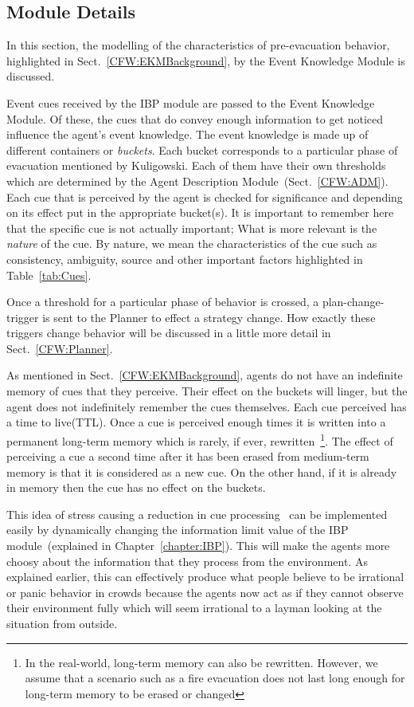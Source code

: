 \subsection{Module Details}
\label{CFW:EKMDetails}

In this section, the modelling of the characteristics of pre-evacuation behavior, highlighted in Sect.~\ref{CFW:EKMBackground}, by the Event Knowledge Module is discussed.

Event cues received by the IBP module are passed to the Event Knowledge Module. Of these, the cues that do convey enough information to get noticed influence the agent's event knowledge. The event knowledge is made up of different containers or \emph{buckets}. Each bucket corresponds to a particular phase of evacuation mentioned by Kuligowski. Each of them have their own thresholds which are determined by the Agent Description Module~(Sect.~\ref{CFW:ADM}). Each cue that is perceived by the agent is checked for significance and depending on its effect put in the appropriate bucket(s). It is important to remember here that the specific cue is not actually important; What is more relevant is the \emph{nature} of the cue. By nature, we mean the characteristics of the cue such as consistency, ambiguity, source and other important factors highlighted in Table~\ref{tab:Cues}.

Once a threshold for a particular phase of behavior is crossed, a plan-change-trigger is sent to the Planner to effect a strategy change. How exactly these triggers change behavior will be discussed in a little more detail in Sect.~\ref{CFW:Planner}.

As mentioned in Sect.~\ref{CFW:EKMBackground}, agents do not have an indefinite memory of cues that they perceive. Their effect on the buckets will linger, but the agent does not indefinitely remember the cues themselves. Each cue perceived has a time to live(TTL). Once a cue is perceived enough times it is written into a permanent long-term memory which is rarely, if ever, rewritten~\footnote{In the real-world, long-term memory can also be rewritten. However, we assume that a scenario such as a fire evacuation does not last long enough for long-term memory to be erased or changed}. The effect of perceiving a cue a second time after it has been erased from medium-term memory is that it is considered as a new cue. On the other hand, if it is already in memory then the cue has no effect on the buckets.

This idea of stress causing a reduction in cue processing~\cite{Ozel:2001tn} can be implemented easily by dynamically changing the information limit value of the IBP module~(explained in Chapter~\ref{chapter:IBP}). This will make the agents more choosy about the information that they process from the environment. As explained earlier, this can effectively produce what people believe to be irrational or panic behavior in crowds because the agents now act as if they cannot observe their environment fully which will seem irrational to a layman looking at the situation from outside.

